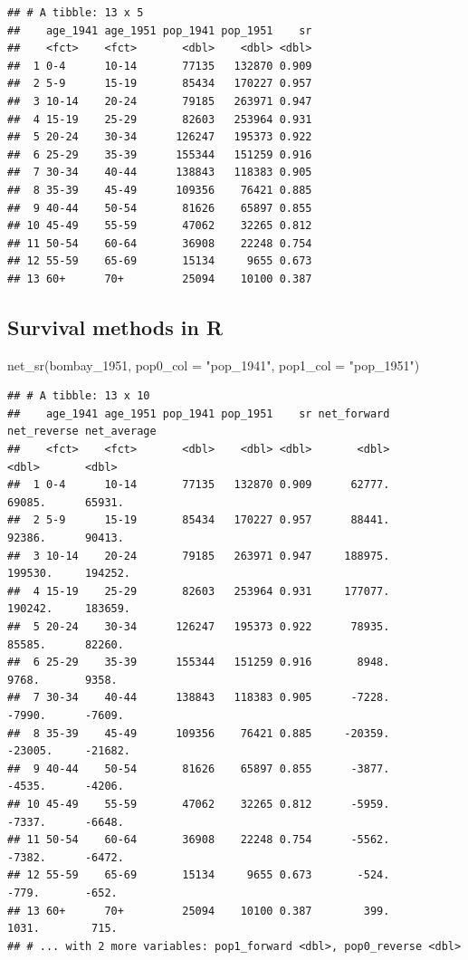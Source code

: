 \documentclass[
]{book}
\newenvironment{Shaded}{\begin{snugshade}}{\end{snugshade}}
\newcommand{\AttributeTok}[1]{\textcolor[rgb]{0.77,0.63,0.00}{#1}}
\newcommand{\FunctionTok}[1]{\textcolor[rgb]{0.00,0.00,0.00}{#1}}
\newcommand{\NormalTok}[1]{#1}
\newcommand{\StringTok}[1]{\textcolor[rgb]{0.31,0.60,0.02}{#1}}
\begin{document}
\begin{verbatim}
## # A tibble: 13 x 5
##    age_1941 age_1951 pop_1941 pop_1951    sr
##    <fct>    <fct>       <dbl>    <dbl> <dbl>
##  1 0-4      10-14       77135   132870 0.909
##  2 5-9      15-19       85434   170227 0.957
##  3 10-14    20-24       79185   263971 0.947
##  4 15-19    25-29       82603   253964 0.931
##  5 20-24    30-34      126247   195373 0.922
##  6 25-29    35-39      155344   151259 0.916
##  7 30-34    40-44      138843   118383 0.905
##  8 35-39    45-49      109356    76421 0.885
##  9 40-44    50-54       81626    65897 0.855
## 10 45-49    55-59       47062    32265 0.812
## 11 50-54    60-64       36908    22248 0.754
## 12 55-59    65-69       15134     9655 0.673
## 13 60+      70+         25094    10100 0.387
\end{verbatim}

\hypertarget{survival-methods-in-r-1}{%
\subsection{Survival methods in R}\label{survival-methods-in-r-1}}

\begin{Shaded}
\begin{Highlighting}[]
\FunctionTok{net\_sr}\NormalTok{(bombay\_1951, }\AttributeTok{pop0\_col =} \StringTok{"pop\_1941"}\NormalTok{, }\AttributeTok{pop1\_col =} \StringTok{"pop\_1951"}\NormalTok{)}
\end{Highlighting}
\end{Shaded}

\begin{verbatim}
## # A tibble: 13 x 10
##    age_1941 age_1951 pop_1941 pop_1951    sr net_forward net_reverse net_average
##    <fct>    <fct>       <dbl>    <dbl> <dbl>       <dbl>       <dbl>       <dbl>
##  1 0-4      10-14       77135   132870 0.909      62777.      69085.      65931.
##  2 5-9      15-19       85434   170227 0.957      88441.      92386.      90413.
##  3 10-14    20-24       79185   263971 0.947     188975.     199530.     194252.
##  4 15-19    25-29       82603   253964 0.931     177077.     190242.     183659.
##  5 20-24    30-34      126247   195373 0.922      78935.      85585.      82260.
##  6 25-29    35-39      155344   151259 0.916       8948.       9768.       9358.
##  7 30-34    40-44      138843   118383 0.905      -7228.      -7990.      -7609.
##  8 35-39    45-49      109356    76421 0.885     -20359.     -23005.     -21682.
##  9 40-44    50-54       81626    65897 0.855      -3877.      -4535.      -4206.
## 10 45-49    55-59       47062    32265 0.812      -5959.      -7337.      -6648.
## 11 50-54    60-64       36908    22248 0.754      -5562.      -7382.      -6472.
## 12 55-59    65-69       15134     9655 0.673       -524.       -779.       -652.
## 13 60+      70+         25094    10100 0.387        399.       1031.        715.
## # ... with 2 more variables: pop1_forward <dbl>, pop0_reverse <dbl>
\end{verbatim}
\end{document}

